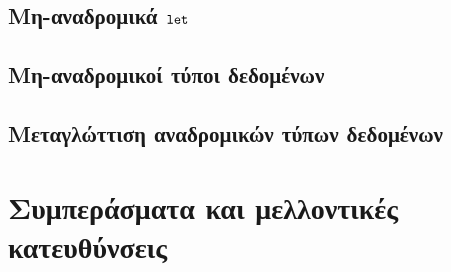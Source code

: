 \documentclass[diploma]{softlab-thesis}
\begin{document}


\section{Μη-αναδρομικά $\operatorname{\texttt{let}}$}



\section{Μη-αναδρομικοί τύποι δεδομένων}
\label{sec:non-recursive-data}


\section{Μεταγλώττιση αναδρομικών τύπων δεδομένων}
\label{sec:compile-recursive-datatypes}



\chapter{Συμπεράσματα και μελλοντικές κατευθύνσεις}
\label{chap:chapter6}


\nocite{*}






\backmatter

\appendix

\end{document}
